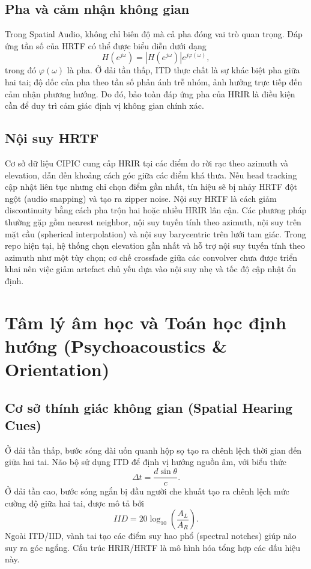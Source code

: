 \section{Pha và cảm nhận không gian}
Trong Spatial Audio, không chỉ biên độ mà cả pha đóng vai trò quan trọng. Đáp ứng tần số của HRTF có thể được biểu diễn dưới dạng
\begin{equation}
    H\left(e^{j\omega}\right)=\left|H\left(e^{j\omega}\right)\right| e^{j\varphi(\omega)},
\end{equation}
trong đó $\varphi(\omega)$ là pha. Ở dải tần thấp, ITD thực chất là sự khác biệt pha giữa hai tai; độ dốc của pha theo tần số phản ánh trễ nhóm, ảnh hưởng trực tiếp đến cảm nhận phương hướng. Do đó, bảo toàn đáp ứng pha của HRIR là điều kiện cần để duy trì cảm giác định vị không gian chính xác.

\section{Nội suy HRTF}
Cơ sở dữ liệu CIPIC cung cấp HRIR tại các điểm đo rời rạc theo azimuth và elevation, dẫn đến khoảng cách góc giữa các điểm khá thưa. Nếu head tracking cập nhật liên tục nhưng chỉ chọn điểm gần nhất, tín hiệu sẽ bị nhảy HRTF đột ngột (audio snapping) và tạo ra zipper noise. Nội suy HRTF là cách giảm discontinuity bằng cách pha trộn hai hoặc nhiều HRIR lân cận. Các phương pháp thường gặp gồm nearest neighbor, nội suy tuyến tính theo azimuth, nội suy trên mặt cầu (spherical interpolation) và nội suy barycentric trên lưới tam giác. Trong repo hiện tại, hệ thống chọn elevation gần nhất và hỗ trợ nội suy tuyến tính theo azimuth như một tùy chọn; cơ chế crossfade giữa các convolver chưa được triển khai nên việc giảm artefact chủ yếu dựa vào nội suy nhẹ và tốc độ cập nhật ổn định.

\chapter{Tâm lý âm học và Toán học định hướng (Psychoacoustics \& Orientation)}

\section{Cơ sở thính giác không gian (Spatial Hearing Cues)}
Ở dải tần thấp, bước sóng dài uốn quanh hộp sọ tạo ra chênh lệch thời gian đến giữa hai tai. Não bộ sử dụng ITD để định vị hướng nguồn âm, với biểu thức
\begin{equation}
    \Delta t = \frac{d\sin\theta}{c}.
\end{equation}
Ở dải tần cao, bước sóng ngắn bị đầu người che khuất tạo ra chênh lệch mức cường độ giữa hai tai, được mô tả bởi
\begin{equation}
    IID = 20\log_{10}\left(\frac{A_L}{A_R}\right).
\end{equation}
Ngoài ITD/IID, vành tai tạo các điểm suy hao phổ (spectral notches) giúp não suy ra góc ngẩng. Cấu trúc HRIR/HRTF là mô hình hóa tổng hợp các dấu hiệu này.


